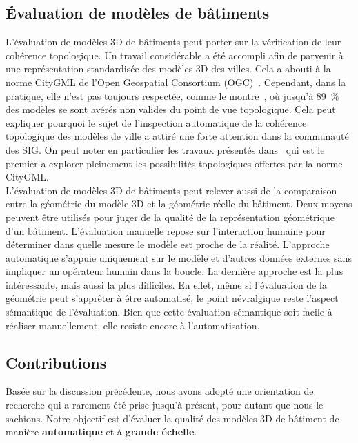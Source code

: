     \subsection*{\'Evaluation de modèles de bâtiments}
        L'évaluation de modèles 3D de bâtiments peut porter sur la vérification de leur cohérence topologique.
        Un travail considérable a été accompli afin de parvenir à une représentation standardisée des modèles 3D des villes.
        Cela a abouti à la norme CityGML de l'Open Geospatial Consortium (OGC)~\parencite{groger2012citygml}.
        Cependant, dans la pratique, elle n'est pas toujours respectée, comme le montre~\parencite{biljecki2016most}, où jusqu'à \SI{89}{\percent} des modèles se sont avérés non valides du point de vue topologique.
        Cela peut expliquer pourquoi le sujet de l'inspection automatique de la cohérence topologique des modèles de ville a attiré une forte attention dans la communauté des SIG.
        On peut noter en particulier les travaux présentés dans~\parencite{ledoux2013validation} qui est le premier a explorer pleinement les possibilités topologiques offertes par la norme CityGML.\\

        L'évaluation de modèles 3D de bâtiments peut relever aussi de la comparaison entre la géométrie du modèle 3D et la géométrie réelle du bâtiment.
        Deux moyens peuvent être utilisés pour juger de la qualité de la représentation géométrique d'un bâtiment.
        L'évaluation manuelle repose sur l'interaction humaine pour déterminer dans quelle mesure le modèle est proche de la réalité.
        L'approche automatique s'appuie uniquement sur le modèle et d'autres données externes sans impliquer un opérateur humain dans la boucle.
        La dernière approche est la plus intéressante, mais aussi la plus difficiles.
        En effet, même si l'évaluation de la géométrie peut s'apprêter à être automatisé, le point névralgique reste l'aspect sémantique de l'évaluation.
        Bien que cette évaluation sémantique soit facile à réaliser manuellement, elle resiste encore à l'automatisation.

    \subsection*{Contributions}
        Basée sur la discussion précédente, nous avons adopté une orientation de recherche qui a rarement été prise jusqu'à présent, pour autant que nous le sachions.
        Notre objectif est d'évaluer la qualité des modèles 3D de bâtiment de manière \textbf{automatique} et à \textbf{grande échelle}.

